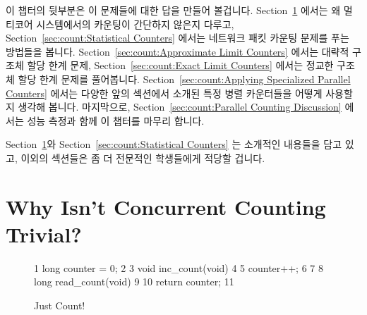 \QuickQuizLabel{\QcountQIOcnt}

이 챕터의 뒷부분은 이 문제들에 대한 답을 만들어 볼겁니다.
Section~\ref{sec:count:Why Isn't Concurrent Counting Trivial?}
에서는 왜 멀티코어 시스템에서의 카운팅이 간단하지 않은지 다루고,
Section~\ref{sec:count:Statistical Counters}
에서는 네트워크 패킷 카운팅 문제를 푸는 방법들을 봅니다.
Section~\ref{sec:count:Approximate Limit Counters}
에서는 대략적 구조체 할당 한계 문제,
Section~\ref{sec:count:Exact Limit Counters}
에서는 정교한 구조체 할당 한계 문제를 풀어봅니다.
Section~\ref{sec:count:Applying Specialized Parallel Counters}
에서는 다양한 앞의 섹션에서 소개된 특정 병렬 카운터들을 어떻게 사용할지 생각해
봅니다.
마지막으로, Section~\ref{sec:count:Parallel Counting Discussion}
에서는 성능 측정과 함께 이 챕터를 마무리 합니다.

Section~\ref{sec:count:Why Isn't Concurrent Counting Trivial?}와
Section~\ref{sec:count:Statistical Counters} 는 소개적인 내용들을 담고 있고,
이외의 섹션들은 좀 더 전문적인 학생들에게 적당할 겁니다.

\section{Why Isn't Concurrent Counting Trivial?}
\label{sec:count:Why Isn't Concurrent Counting Trivial?}

\begin{figure}[bp]
{ \scriptsize
\begin{verbbox}
  1 long counter = 0;
  2 
  3 void inc_count(void)
  4 {
  5   counter++;
  6 }
  7 
  8 long read_count(void)
  9 {
 10   return counter;
 11 }
\end{verbbox}
}
\centering
\theverbbox
\caption{Just Count!}
\label{fig:count:Just Count!}
\end{figure}

